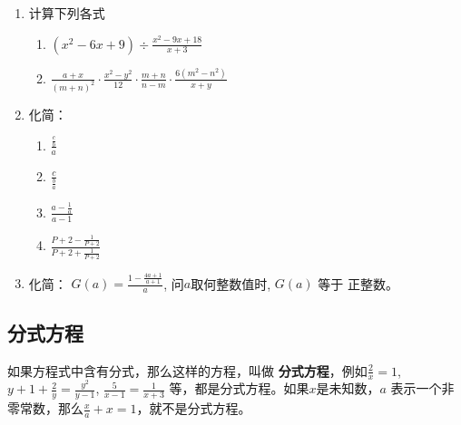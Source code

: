 \begin{ex}
\begin{enumerate} 
\item 计算下列各式
\begin{enumerate}
    \item  $\left(x^{2}-6 x+9\right) \div \frac{x^{2}-9 x+18}{x+3}$
    \item $\frac{a+x}{(m+n)^{2}} \cdot \frac{x^{2}-y^{2}}{12} \cdot \frac{m+n}{n-m} \cdot \frac{6\left(m^{2}-n^{2}\right)}{x+y}$
\end{enumerate}
\item 化简：
\begin{multicols}{2}
\begin{enumerate}
    \item $\frac{\frac{c}{b}}{a}$
    \item $\frac{c}{\frac{b}{a}}$
    \item $\frac{a-\frac{1}{a}}{a-1}$
    \item $\frac{P+2-\frac{1}{P+2}}{P+2+\frac{1}{P+2}}$
\end{enumerate}
\end{multicols}
\item 化简： $G(a)=\frac{1-\frac{4 a+1}{a+1}}{a}$, 问$a$取何整数值时, $G(a)$ 等于 正整数。
\end{enumerate}
\end{ex}

\subsection{分式方程}
如果方程式中含有分式，那么这样的方程，叫做
\textbf{分式方程}，例如$\frac{2}{x}=1$, $y+1+\frac{2}{y}=\frac{y^2}{y-1}$, $\frac{5}{x-1}=\frac{1}{x+3}$
等，都是分式方程。如果$x$是未知数，$a$
表示一个非零常数，那么$\frac{x}{a}+x=1$，就不是分式方程。

